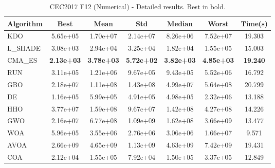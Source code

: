 \begin{table}[H]
\centering\small
\caption{CEC2017 F12 (Numerical) - Detailed results. Best in bold.}
\label{tab:cec2017_F12}
\begin{tabular}{lcccccc}
\toprule
\textbf{Algorithm} & \textbf{Best} & \textbf{Mean} & \textbf{Std} & \textbf{Median} & \textbf{Worst} & \textbf{Time(s)} \\
\midrule
KDO & 5.65e+05 & 1.70e+07 & 2.14e+07 & 8.26e+06 & 7.52e+07 & 19.303 \\
L_SHADE & 3.08e+03 & 2.94e+04 & 3.25e+04 & 1.82e+04 & 1.55e+05 & 15.003 \\
CMA_ES & \textbf{2.13e+03} & \textbf{3.78e+03} & \textbf{5.72e+02} & \textbf{3.82e+03} & \textbf{4.85e+03} & \textbf{19.240} \\
RUN & 3.11e+05 & 1.21e+06 & 9.67e+05 & 9.43e+05 & 5.52e+06 & 16.792 \\
GBO & 2.18e+07 & 1.11e+08 & 1.43e+08 & 4.99e+07 & 5.64e+08 & 20.799 \\
DE & 1.16e+05 & 5.99e+05 & 4.91e+05 & 4.98e+05 & 2.32e+06 & 13.188 \\
HHO & 3.77e+07 & 1.59e+08 & 9.67e+07 & 1.42e+08 & 4.27e+08 & 14.226 \\
GWO & 2.16e+07 & 6.77e+08 & 1.09e+09 & 1.62e+08 & 3.66e+09 & 13.477 \\
WOA & 5.96e+05 & 3.55e+06 & 2.76e+06 & 3.06e+06 & 1.66e+07 & 9.571 \\
AVOA & 2.66e+09 & 4.65e+09 & 1.13e+09 & 4.63e+09 & 7.42e+09 & 19.431 \\
COA & 2.12e+04 & 1.55e+05 & 7.92e+04 & 1.50e+05 & 3.37e+05 & 12.849 \\
\bottomrule
\end{tabular}
\end{table}
